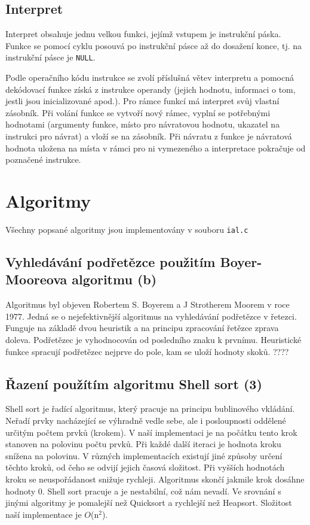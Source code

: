 \documentclass[a4paper, 11pt]{article}
\begin{document}
    \subsection{Interpret}
    Interpret obsahuje jednu velkou funkci, jejímž vstupem je instrukční páska. Funkce se pomocí cyklu posouvá po instrukční pásce až do dosažení konce, tj. na instrukční pásce je \texttt{NULL}.\par
    Podle operačního kódu instrukce se zvolí příslušná větev interpretu a pomocná dekódovací funkce získá z instrukce operandy (jejich hodnotu, informaci o tom, jestli jsou inicializované apod.). Pro rámce funkcí má interpret svůj vlastní zásobník. Při volání funkce se vytvoří nový rámec, vyplní se potřebnými hodnotami (argumenty funkce, místo pro návratovou hodnotu, ukazatel na instrukci pro návrat) a vloží se na zásobník. Při návratu z funkce je návratová hodnota uložena na místa v rámci pro ni vymezeného a interpretace pokračuje od poznačené instrukce.
    \section{Algoritmy}
    Všechny popsané algoritmy jsou implementovány v souboru \texttt{ial.c}
    \subsection{Vyhledávání podřetězce použitím Boyer-Mooreova algoritmu (b)}
    Algoritmus byl objeven Robertem S. Boyerem a J Strotherem Moorem v roce 1977. Jedná se o nejefektivnější algoritmus na vyhledávání podřetězce v řetezci. Funguje na základě dvou heuristik a na principu zpracování řetězce zprava doleva. Podřetězec je vyhodnocován od posledního znaku k prvnímu. Heuristické funkce spracují podřetězec nejprve do pole, kam se uloží hodnoty skoků. ????
    \subsection{Řazení použítím algoritmu Shell sort (3)}
    Shell sort je řadící algoritmus, který pracuje na principu bublinového vkládání. Neřadí prvky nacházející se výhradně vedle sebe, ale i posloupnosti oddělené určitým počtem prvků (krokem). V naší implementaci je na počátku tento krok stanoven na polovinu počtu prvků. Při každé další iteraci je hodnota kroku snížena na polovinu. V různých implementacích existují jiné způsoby určení těchto kroků, od čeho se odvijí jejich časová složitost. Při vyšších hodnotách kroku se neuspořádanost snižuje rychleji. Algoritmus skončí jakmile krok dosáhne hodnoty 0. Shell sort pracuje  a je nestabilní, což nám nevadí. Ve srovnání s jinými algoritmy je pomalejší než Quicksort a rychlejší než Heapsort. Složitost naší implementace je $O$(n$^2$).
\end{document}
